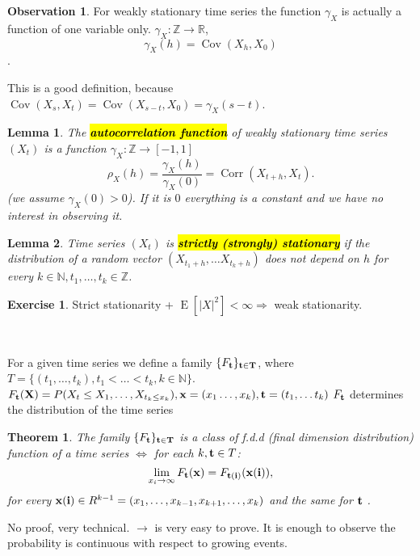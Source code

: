\documentclass[12pt,a4paper, notitlepage]{book}
\newcommand{\hlc}[2][yellow]{ {\sethlcolor{#1} \hl{#2}} }
\newcommand{\hlcr}[1]{\hlc[lightred]{#1}}
\theoremstyle{definition} %
\newtheorem{exercise}{Exercise}[chapter]
\newtheorem*{observation}{Observation}
\theoremstyle{plain} %
\newtheorem{definition}{Lemma}[chapter]
\newtheorem{theorem}{Theorem}
\newcommand{\R}{\mathbb R}
\newcommand{\N}{\mathbb N}
\newcommand{\Z}{\mathbb Z}
\DeclareMathOperator{\Cov}{Cov}
\DeclareMathOperator{\E}{E}
\DeclareMathOperator{\Corr}{Corr}
\newcommand{\New}[1]{ {\bf \hlcr{#1} } }
\begin{document}
\begin{observation}
For weakly stationary time series the function $\gamma_X$ is actually a function of one variable only. 
$\gamma_X : \Z \rightarrow \R$,
\[ \gamma_X(h) = \Cov(X_h, X_0)\].

This is a good definition, because $ \Cov(X_s, X_t) = \Cov(X_{s-t},X_0) = \gamma_X(s-t)$. 
\end{observation}


\begin{definition}
The \New{autocorrelation function} of weakly stationary time series $(X_t)$ is a function
$\gamma_X : \Z \rightarrow [-1, 1]$
\[ \rho_X(h) = \frac{\gamma_X(h)}{\gamma_X(0)} = \Corr(X_{t+h},X_t) . \]
(we assume $\gamma_X(0) > 0$). If it is $0$ everything is a constant and we have no interest in observing it.
\end{definition}

\begin{definition}
Time series $(X_t)$ is \New{strictly (strongly) stationary} if the distribution of a random vector $(X_{t_1 + h}, \dots X_{t_k + h})$ does not depend on $h$ for every $k\in \N, t_1, \dots, t_k \in \Z $.
\end{definition}

\begin{exercise}
Strict stationarity + $ \E [|X|^2] < \infty \Rightarrow$ weak stationarity.
\end{exercise}
\


For a given time series we define a family 
$\{  F_{\bf t} \}_{\bf t \in T}$, where $T = \{(t_1, \dots, t_k), t_1 < \dots < t_k, k \in \N\}$.
$F_{\bf t}({\bf X}) = P(X_t \leq X_1, \dots, X_{t_k \leq x_k}), {\bf x} = (x_1 \dots, x_k), {\bf t} = (t_1, \dots t_k)$
$F_{ \bf t}$ determines the distribution of the time series


\begin{theorem} 
The family $\{F_{\bf t}\}_{\bf t \in T}$ is a class of f.d.d (final dimension distribution) function of a time series
$\iff $
for each $k, {\bf t } \in T$:
\[ \lim_{x_i \rightarrow \infty} F_{\bf t}({\bf x}) = F_{\bf t(i)}  ({\bf x(i)}) , \] 
for every ${\bf x(i)} \in R^{k-1} = (x_1,\dots,x_{k-1},x_{k+1},\dots, x_k)$ and the same for ${\bf t}$ .
\label{th:1}
\end{theorem}
\proof
No proof, very technical. 
$\rightarrow$ is very easy to prove. It is enough to observe the probability is continuous with respect to growing events.
\endproof
\end{document}
